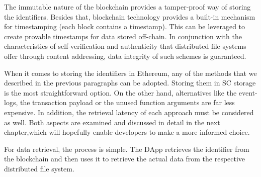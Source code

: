 The immutable nature of the blockchain provides a tamper-proof way of storing the identifiers. Besides that, blockchain technology provides a built-in mechanism for timestamping (each block contains a timestamp). This can be leveraged to create provable timestamps for data stored off-chain. In conjunction with the characteristics of self-verification and authenticity that distributed file systems offer through content addressing, data integrity of such schemes is guaranteed.

When it comes to storing the identifiers in Ethereum, any of the methods that we described in the previous paragraphs can be adopted. Storing them in SC storage is the most straightforward option. On the other hand, alternatives like the event-logs, the transaction payload or the unused function arguments are far less expensive. In addition, the retrieval latency of each approach must be considered as well. Both aspects are examined and discussed in detail in the next chapter,which will hopefully enable developers to make a more informed choice.

For data retrieval, the process is simple. The DApp retrieves the identifier from the blockchain and then uses it to retrieve the actual data from the respective distributed file system.
